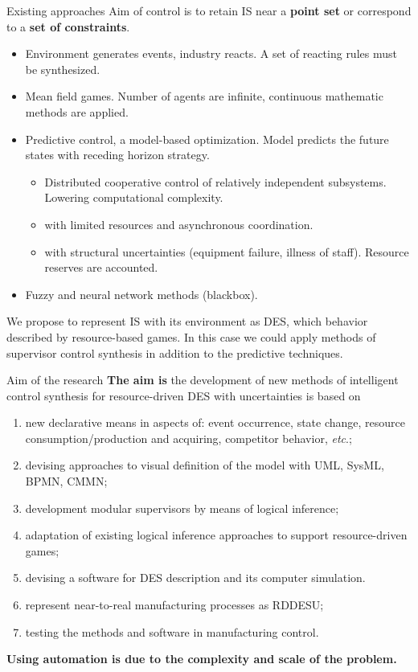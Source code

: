 \documentclass[10pt,dvipsnames]{beamer}
\begin{document}
\begin{frame}{Existing approaches}
  Aim of control is to retain IS near a \textbf{point set} or correspond to a \textbf{set of constraints}.
  \begin{itemize}
  \item Environment generates events, industry reacts. A set of reacting rules must be synthesized.
  \item Mean field games. Number of agents are infinite, continuous mathematic methods are applied.
  \item Predictive control, a model-based optimization. Model predicts the future states with \alert{receding horizon} strategy.
    \begin{itemize}
     \item \alert{Distributed cooperative control} of relatively
       independent subsystems. Lowering computational complexity.
     \item with limited resources and asynchronous coordination.
     \item with structural uncertainties (equipment failure, illness of staff). Resource reserves are accounted.
     \end{itemize}
  \item Fuzzy and neural network methods (blackbox).
  \end{itemize}

  We propose to represent IS with its environment as DES, which behavior described by resource-based games.  In this case we could apply methods of supervisor control synthesis in addition to the predictive techniques.

\end{frame}

\begin{frame}{Aim of the research}
\textbf{The aim is} the development of new methods of intelligent control synthesis for resource-driven DES with uncertainties is based on
\begin{enumerate}
\item new declarative means in aspects of: event occurrence, state change, resource consumption/production and acquiring, competitor behavior, \emph{etc}.;
\item devising approaches to visual definition of the model with UML, SysML, BPMN, CMMN;
\item development modular supervisors by means of logical inference;
\item adaptation of existing logical inference approaches to support resource-driven games;
\item devising a software for DES description and its computer simulation.
\item represent near-to-real manufacturing processes as RDDESU;
\item testing the methods and software in manufacturing control.
\end{enumerate}

\textbf{Using automation is due to the complexity and scale of the problem.}
\end{frame}
\end{document}
